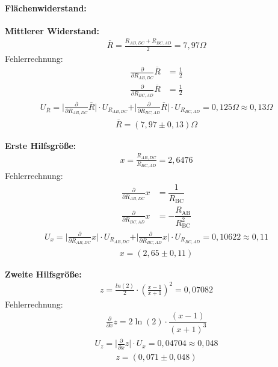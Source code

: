 \documentclass[a4paper]{scrartcl}
\numberwithin{equation}{subsection}
\begin{document}
\paragraph{Flächenwiderstand:\\}
\textbf{Mittlerer Widerstand:}\\
\begin{align}
\overline{R} = \frac{R_{AB,DC}+R_{BC,AD}}{2} = 7,97 \Omega
\end{align}
Fehlerrechnung:
\begin{align*}
\frac{\partial}{\partial R_{AB,DC}} \overline{R} &= \frac{1}{2} \\
\frac{\partial}{\partial R_{BC,AD}} \overline{R} &= \frac{1}{2}
\end{align*}
\begin{align*}
U_{\overline{R}} = \vert \frac{\partial}{\partial R_{AB,DC}} \overline{R} \vert \cdot U_{R_{AB,DC}} +  \vert \frac{\partial}{\partial R_{BC,AD}} \overline{R} \vert \cdot U_{R_{BC,AD}} = 0,125 \Omega \approx 0,13 \Omega
\end{align*}
\begin{align*}
\overline{R} = (7,97 \pm 0,13)\Omega
\end{align*}

\textbf{Erste Hilfsgröße:}\\
\begin{align}
x = \frac{R_{AB,DC}}{R_{BC,AD}} = 2,6476
\end{align}
Fehlerrechnung:
\begin{align*}
\frac{\partial}{\partial R_{AB,DC}} x &= \dfrac{1}{R_\text{BC}} \\
\frac{\partial}{\partial R_{BC,AD}} x &= -\dfrac{R_\text{AB}}{R_\text{BC}^2}
\end{align*}
\begin{align*}
U_{x} = \vert \frac{\partial}{\partial R_{AB,DC}} x \vert \cdot U_{R_{AB,DC}} + \vert \frac{\partial}{\partial R_{BC,AD}} x \vert \cdot U_{R_{BC,AD}} = 0,10622 \approx 0,11
\end{align*}
\begin{align*}
x = (2,65 \pm 0,11)
\end{align*}

\textbf{Zweite Hilfsgröße:}\\
\begin{align}
z = \frac{ln(2)}{2} \cdot (\frac{x-1}{x+1})^2 = 0,07082
\end{align}
Fehlerrechnung:
\begin{align*}
\frac{\partial}{\partial x} z = 2\ln\left(2\right)\cdot\dfrac{\left(x-1\right)}{\left(x+1\right)^3}
\end{align*}
\begin{align*}
U_{z} = \vert \frac{\partial}{\partial x} z \vert \cdot U_{x} = 0,04704 \approx 0,048
\end{align*}
\begin{align*}
z = (0,071 \pm 0,048)
\end{align*}
\end{document}
